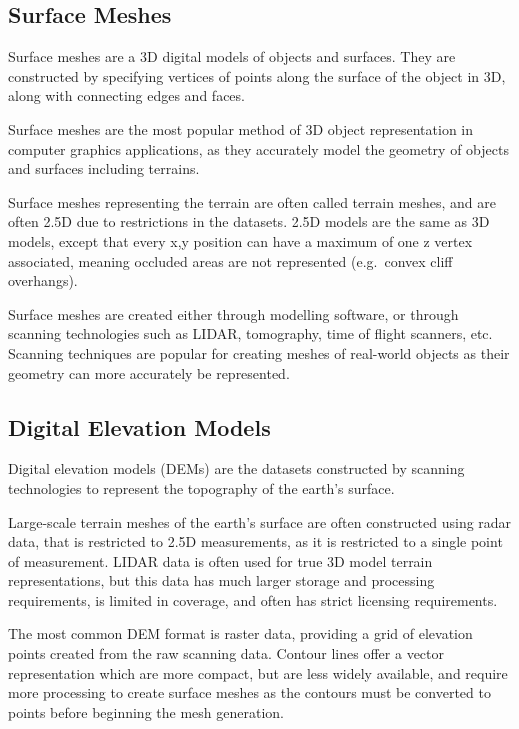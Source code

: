 \documentclass[12pt]{article}
\begin{document}
\subsection{Surface Meshes}

Surface meshes are a 3D digital models of objects and surfaces. They are constructed by specifying vertices of points along the surface of the object in 3D, along with connecting edges and faces.

Surface meshes are the most popular method of 3D object representation in computer graphics applications, as they accurately model the geometry of objects and surfaces including terrains.

Surface meshes representing the terrain are often called terrain meshes, and are often 2.5D due to restrictions in the datasets. 2.5D models are the same as 3D models, except that every x,y position can have a maximum of one z vertex associated, meaning occluded areas are not represented (e.g.\ convex cliff overhangs).

Surface meshes are created either through modelling software, or through scanning technologies such as LIDAR, tomography, time of flight scanners, etc. Scanning techniques are popular for creating meshes of real-world objects as their geometry can more accurately be represented.


\subsection{Digital Elevation Models}

Digital elevation models (DEMs) are the datasets constructed by scanning technologies to represent the topography of the earth's surface.

Large-scale terrain meshes of the earth's surface are often constructed using radar data, that is restricted to 2.5D measurements, as it is restricted to a single point of measurement. LIDAR data is often used for true 3D model terrain representations, but this data has much larger storage and processing requirements, is limited in coverage, and often has strict licensing requirements.

The most common DEM format is raster data, providing a grid of elevation points created from the raw scanning data. Contour lines offer a vector representation which are more compact, but are less widely available, and require more processing to create surface meshes as the contours must be converted to points before beginning the mesh generation.
\end{document}
